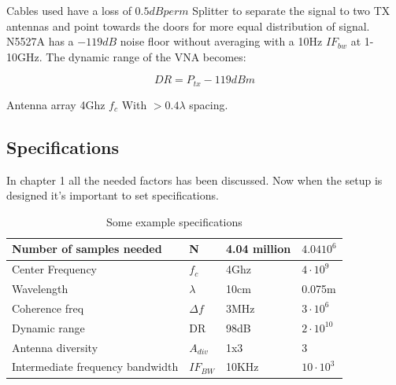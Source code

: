 Cables used have a loss of $0.5dB per m$ 
Splitter to separate the signal to two TX antennas and point towards the doors for more equal distribution of signal.
N5527A has a $-119dB$ noise floor without averaging with a 10Hz $IF_{bw}$ at 1-10GHz. The dynamic range of the VNA becomes:

\begin{equation}
DR = P_{tx}-119dBm 
\label{NFvna}
\end{equation}

Antenna array 4Ghz $f_c$ With $>0.4 \lambda$ spacing.

\subsection{Specifications}
In chapter 1 all the needed factors has been discussed. Now when the setup is designed it's important to set specifications.
\begin{table}[H]
\centering
\caption{Some example specifications}
\label{final_specs}
\begin{tabular}{|l|l|l|l|}
\hline
Number of samples needed         & N           & 4.04 million   & $4.04 10^6$        \\ \hline
Center Frequency                 & $f_c$       & 4Ghz           & $4 \cdot 10^9$     \\ \hline
Wavelength                       & $\lambda$   & 10cm           & 0.075m               \\ \hline
Coherence freq                   & $\Delta f$  & 3MHz           & $3 \cdot 10^6$     \\ \hline
Dynamic range                    & DR          & 98dB           & $2\cdot 10^10$             \\ \hline
Antenna diversity                & $A_{div}$   & 1x3            & 3                  \\ \hline
Intermediate frequency bandwidth & $IF_{BW}$     & 10KHz          & $10 \cdot 10^3$ \\ \hline
\end{tabular}
\end{table}
